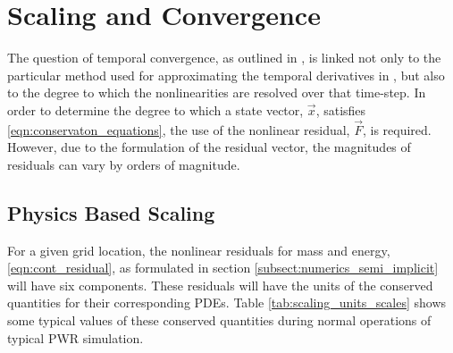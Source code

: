 \chapter{Scaling and Convergence}
\label{chap:scaling_and_convergence}
The question of temporal convergence, as outlined in , is linked not only to the particular method used for approximating the temporal derivatives in , but also to the degree to which the nonlinearities are resolved over that time-step. 
In order to determine the degree to which a state vector, $\vec{x}$, satisfies \eqref{eqn:conservaton_equations}, the use of the nonlinear residual, $\vec{F}$, is required.
However, due to the formulation of the residual vector, the magnitudes of residuals can vary by orders of magnitude.

\section{Physics Based Scaling}
\label{sect:scaling}
For a given grid location, the nonlinear residuals for mass and energy, \eqref{eqn:cont_residual}, as formulated in section \ref{subsect:numerics_semi_implicit} will have six components.
These residuals will have the units of the conserved quantities for their corresponding PDEs.
Table \ref{tab:scaling_units_scales} shows some typical values of these conserved quantities during normal operations of typical PWR simulation.

